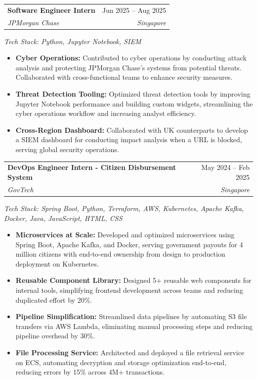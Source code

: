 \documentclass[letter-paper,11pt]{article}
\makeatletter
\newcommand{\resumeItem}[1]{
  \item\small{
    {#1 \vspace{-2pt}}
  }
}
\newcommand{\resumeSubheading}[4]{
  \vspace{-2pt}\item
    \begin{tabular*}{0.97\textwidth}[t]{l@{\extracolsep{\fill}}r}
      \textbf{#1} & #2 \\
      \textit{#3} & \textit{\small #4} \\
    \end{tabular*}\vspace{-8pt}
}
\newcommand{\resumeTechnologies}[1]{
  \item{
    \textit{\small Tech Stack: #1} \vspace{-8pt}
  }
}
\newcommand{\resumeItemListStart}{\begin{itemize}}
\newcommand{\resumeItemListEnd}{\end{itemize}\vspace{-7pt}}
\makeatother
\begin{document}
    \resumeSubheading
    {Software Engineer Intern}{Jun 2025 -- Aug 2025}
    {JPMorgan Chase}{Singapore}
    \resumeTechnologies{Python, Jupyter Notebook, SIEM}
    \resumeItemListStart
        \resumeItem{\textbf{Cyber Operations:} Contributed to cyber operations by conducting attack analysis and protecting JPMorgan Chase's systems from potential threats. Collaborated with cross-functional teams to enhance security measures.}
        \resumeItem{\textbf{Threat Detection Tooling:} Optimized threat detection tools by improving Jupyter Notebook performance and building custom widgets, streamlining the cyber operations workflow and increasing analyst efficiency.}
        \resumeItem{\textbf{Cross-Region Dashboard:} Collaborated with UK counterparts to develop a SIEM dashboard for conducting impact analysis when a URL is blocked, serving global security operations.}
    \resumeItemListEnd
    
     \resumeSubheading
    {DevOps Engineer Intern - Citizen Disbursement System}{May 2024 -- Feb 2025}
    {GovTech}{Singapore}
    \resumeTechnologies{Spring Boot, Python, Terraform, AWS, Kubernetes, Apache Kafka, Docker, Java, JavaScript, HTML, CSS}
    \resumeItemListStart
        \resumeItem{\textbf{Microservices at Scale:} Developed and optimized microservices using Spring Boot, Apache Kafka, and Docker, serving government payouts for 4 million citizens with end-to-end ownership from design to production deployment on Kubernetes.}
        \resumeItem{\textbf{Reusable Component Library:} Designed 5+ reusable web components for internal tools, simplifying frontend development across teams and reducing duplicated effort by 20\%.}
        \resumeItem{\textbf{Pipeline Simplification:} Streamlined data pipelines by automating S3 file transfers via AWS Lambda, eliminating manual processing steps and reducing pipeline overhead by 30\%.}
        \resumeItem{\textbf{File Processing Service:} Architected and deployed a file retrieval service on ECS, automating decryption and storage optimization end-to-end, reducing errors by 15\% across 4M+ transactions.}
    \resumeItemListEnd
\end{document}
